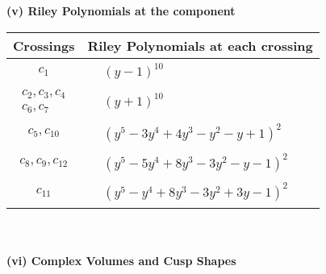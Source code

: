 \documentclass[1p]{elsarticle_modified}
\theoremstyle{definition}
\begin{document}
\newpage\renewcommand{\arraystretch}{1}
\flushleft \textbf{(v) Riley Polynomials at the component}\newline \\
\begin{tabular}{m{50pt}|m{274pt}}
Crossings & \hspace{64pt}Riley Polynomials at each crossing \\
\hline $$\begin{aligned}c_{1}\end{aligned}$$&$\begin{aligned}
&(y-1)^{10}
\end{aligned}$\\
\hline $$\begin{aligned}c_{2},c_{3},c_{4}\\c_{6},c_{7}\end{aligned}$$&$\begin{aligned}
&(y+1)^{10}
\end{aligned}$\\
\hline $$\begin{aligned}c_{5},c_{10}\end{aligned}$$&$\begin{aligned}
&(y^5-3 y^4+4 y^3- y^2- y+1)^2
\end{aligned}$\\
\hline $$\begin{aligned}c_{8},c_{9},c_{12}\end{aligned}$$&$\begin{aligned}
&(y^5-5 y^4+8 y^3-3 y^2- y-1)^2
\end{aligned}$\\
\hline $$\begin{aligned}c_{11}\end{aligned}$$&$\begin{aligned}
&(y^5- y^4+8 y^3-3 y^2+3 y-1)^2
\end{aligned}$\\
\hline
\end{tabular}\\~\\
\newpage\flushleft \textbf{(vi) Complex Volumes and Cusp Shapes}
\end{document}
